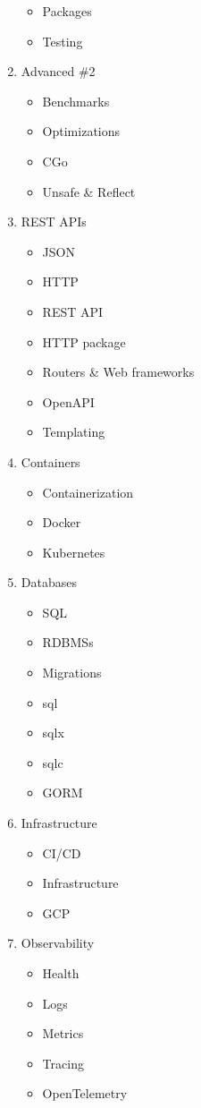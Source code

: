 \documentclass[
  digital,
  color,
  oneside,
  nosansbold,
  nocolorbold,
  lof,
  lot,
]{fithesis4}
\begin{document}
\begin{enumerate}
\begin{itemize}
        \item Packages
        \item Testing
    \end{itemize}
    \item Advanced \#2
    \begin{itemize}
        \item Benchmarks
        \item Optimizations
        \item CGo
        \item Unsafe \& Reflect
    \end{itemize}
    \item REST APIs
    \begin{itemize}
        \item JSON
        \item HTTP
        \item REST API
        \item HTTP package
        \item Routers \& Web frameworks
        \item OpenAPI
        \item Templating
    \end{itemize}
    \item Containers
    \begin{itemize}
        \item Containerization
        \item Docker
        \item Kubernetes
    \end{itemize}
    \item Databases
    \begin{itemize}
        \item SQL
        \item RDBMSs
        \item Migrations
        \item sql
        \item sqlx
        \item sqlc
        \item GORM
    \end{itemize}
    \item Infrastructure
    \begin{itemize}
        \item CI/CD
        \item Infrastructure
        \item GCP
    \end{itemize}
    \item Observability
    \begin{itemize}
        \item Health
        \item Logs
        \item Metrics
        \item Tracing
        \item OpenTelemetry
    \end{itemize}
\end{enumerate}
\end{document}

